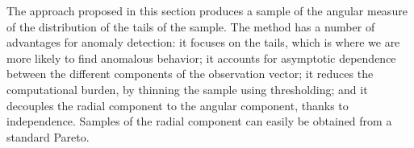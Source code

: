 The approach proposed in this section produces a sample of the angular measure 
    of the distribution of the tails of the sample. The method has a number of 
    advantages for anomaly detection: it focuses on the tails, which is where we 
    are more likely to find anomalous behavior;  it accounts for asymptotic 
    dependence between the different components of the observation vector; it
    reduces the computational burden, by thinning the sample using thresholding; 
    and it decouples the radial component to the angular component, thanks to 
    independence. Samples of the radial component can easily be obtained from a 
    standard Pareto.

